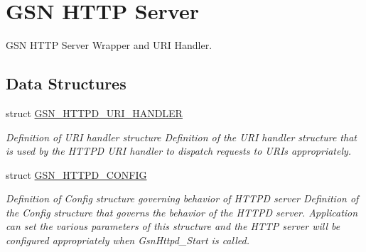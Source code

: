 \hypertarget{a00666}{
\section{GSN HTTP Server}
\label{a00666}
}


GSN HTTP Server Wrapper and URI Handler.  


\subsection*{Data Structures}
\begin{DoxyCompactItemize}
\item 
struct \hyperlink{a00097}{GSN\_\-HTTPD\_\-URI\_\-HANDLER}
\begin{DoxyCompactList}\small\item\em Definition of URI handler structure Definition of the URI handler structure that is used by the HTTPD URI handler to dispatch requests to URIs appropriately. \end{DoxyCompactList}\item 
struct \hyperlink{a00095}{GSN\_\-HTTPD\_\-CONFIG}
\begin{DoxyCompactList}\small\item\em Definition of Config structure governing behavior of HTTPD server Definition of the Config structure that governs the behavior of the HTTPD server. Application can set the various parameters of this structure and the HTTP server will be configured appropriately when GsnHttpd\_\-Start is called. \end{DoxyCompactList}\end{DoxyCompactItemize}
